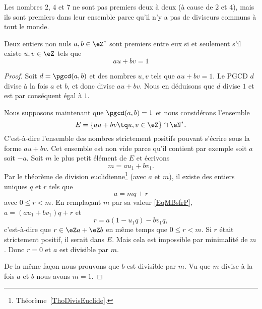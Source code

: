 Les nombres \( 2\), \( 4\) et \( 7\) ne sont pas premiers deux à deux (à cause de \( 2\) et \( 4\)), mais ils sont premiers dans leur ensemble parce qu'il n'y a pas de diviseurs communs à tout le monde.

\begin{theorem} \label{ThoBuNjam}
    Deux entiers non nuls \( a,b\in\eZ^*\) sont premiers entre eux si et seulement s'il existe \( u,v\in\eZ\) tels que
    \begin{equation}
        au+bv=1
    \end{equation}
\end{theorem}

\begin{proof}
    Soit \( d=\pgcd(a,b)\) et des nombres \( u,v\) tels que \( au+bv=1\). Le PGCD \( d\) divise à la fois \( a\) et \( b\), et donc divise \( au+bv\). Nous en déduisons que \( d\) divise \( 1\) et est par conséquent égal à \( 1\).

    Nous supposons maintenant que \( \pgcd(a,b)=1\) et nous considérons l'ensemble
    \begin{equation}
        E=\{ au+bv\tq u,v\in \eZ \}\cap \eN^*.
    \end{equation}
    C'est-à-dire l'ensemble des nombres strictement positifs pouvant s'écrire sous la forme \( au+bv\). Cet ensemble est non vide parce qu'il contient par exemple soit \( a\) soit \( -a\). Soit \( m\) le plus petit élément de \( E\) et écrivons
    \begin{equation}    \label{EqMBsfrP}
        m=au_1+bv_1.
    \end{equation}
    Par le théorème de division euclidienne\footnote{Théorème~\ref{ThoDivisEuclide}.} (avec \( a\) et \( m\)), il existe des entiers uniques $q$ et $r$ tels que
    \begin{equation}
        a=mq+r
    \end{equation}
    avec \( 0\leq r<m\). En remplaçant \( m\) par sa valeur \eqref{EqMBsfrP}, \( a=(au_1+bv_1)q+r\) et
    \begin{equation}
        r=a(1-u_1q)-bv_1q,
    \end{equation}
    c'est-à-dire que \( r\in \eZ a+\eZ b\) en même temps que \( 0\leq r<m\). Si \( r\) était strictement positif, il serait dans \( E\). Mais cela est impossible par minimalité de \( m\). Donc \( r=0\) et \( a\) est divisible par \( m\).

    De la même façon nous prouvons que \( b\) est divisible par \( m\). Vu que \( m\) divise à la fois \( a\) et \( b\) nous avons \( m=1\).
\end{proof}

